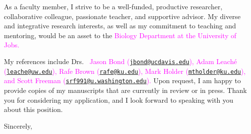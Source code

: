 \documentclass[letterpaper, 10pt]{letter}
\newcommand{\highlight}[1]{\textcolor{magenta}{#1}}
\begin{document}
\begin{letter}


As a faculty member, I strive to be a well-funded, productive researcher,
collaborative colleague, passionate teacher, and supportive advisor.
My diverse and integrative research interests, as well as my commitment to
teaching and mentoring, would be an asset to the
\highlight{
Biology Department
at
the University of Jobs.
}

My references include Drs.\
\highlight{
Jason Bond
(\href{mailto:jbond@ucdavis.edu}{\tt jbond@ucdavis.edu}),
Adam Leach\'{e}
(\href{mailto:leache@uw.edu}{\tt leache@uw.edu}),
Rafe Brown
(\href{mailto:rafe@ku.edu}{\tt rafe@ku.edu}),
Mark Holder
(\href{mailto:mtholder@ku.edu}{\tt mtholder@ku.edu}),
and
Scott Freeman
(\href{mailto:srf991@u.washington.edu}{\tt srf991@u.washington.edu}).
}
Upon request, I am happy to provide copies of my manuscripts that are currently
in review or in press.
Thank you for considering my application, and I look forward to speaking with
you about this position.

\addtolength{\medskipamount}{-5pt}
\closing{Sincerely,}
\end{letter}
\end{document}
